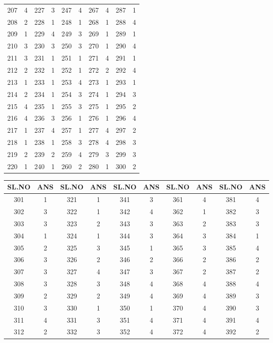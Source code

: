 {\begin{tabular}{|c|c||c|c||c|c||c|c||c|c|}
207 & 4 & 227 & 3 & 247 & 4 & 267 & 4 & 287 & 1 \\
208 & 2 & 228 & 1 & 248 & 1 & 268 & 1 & 288 & 4 \\
209 & 1 & 229 & 4 & 249 & 3 & 269 & 1 & 289 & 1 \\
210 & 3 & 230 & 3 & 250 & 3 & 270 & 1 & 290 & 4 \\
211 & 3 & 231 & 1 & 251 & 1 & 271 & 4 & 291 & 1 \\
212 & 2 & 232 & 1 & 252 & 1 & 272 & 2 & 292 & 4 \\
213 & 1 & 233 & 1 & 253 & 4 & 273 & 1 & 293 & 1 \\
214 & 2 & 234 & 1 & 254 & 3 & 274 & 1 & 294 & 3 \\
215 & 4 & 235 & 1 & 255 & 3 & 275 & 1 & 295 & 2 \\
216 & 4 & 236 & 3 & 256 & 1 & 276 & 1 & 296 & 4 \\
217 & 1 & 237 & 4 & 257 & 1 & 277 & 4 & 297 & 2 \\
218 & 1 & 238 & 1 & 258 & 3 & 278 & 4 & 298 & 3 \\
219 & 2 & 239 & 2 & 259 & 4 & 279 & 3 & 299 & 3 \\
220 & 1 & 240 & 1 & 260 & 2 & 280 & 1 & 300 & 2 \\
\hline
\end{tabular}\par\bigskip
\begin{tabular}{|c|c||c|c||c|c||c|c||c|c|}
\hline
SL.NO & ANS & SL.NO & ANS & SL.NO & ANS & SL.NO & ANS & SL.NO & ANS \\
\hline
301 & 1 & 321 & 1 & 341 & 3 & 361 & 4 & 381 & 4 \\
302 & 3 & 322 & 1 & 342 & 4 & 362 & 1 & 382 & 3 \\
303 & 3 & 323 & 2 & 343 & 3 & 363 & 2 & 383 & 3 \\
304 & 1 & 324 & 1 & 344 & 3 & 364 & 3 & 384 & 1 \\
305 & 2 & 325 & 3 & 345 & 1 & 365 & 3 & 385 & 4 \\
306 & 3 & 326 & 2 & 346 & 2 & 366 & 2 & 386 & 2 \\
307 & 3 & 327 & 4 & 347 & 3 & 367 & 2 & 387 & 2 \\
308 & 3 & 328 & 3 & 348 & 4 & 368 & 4 & 388 & 4 \\
309 & 2 & 329 & 2 & 349 & 4 & 369 & 4 & 389 & 3 \\
310 & 3 & 330 & 1 & 350 & 1 & 370 & 4 & 390 & 3 \\
311 & 4 & 331 & 3 & 351 & 4 & 371 & 4 & 391 & 4 \\
312 & 2 & 332 & 3 & 352 & 4 & 372 & 4 & 392 & 2 \\

\end{tabular}}
